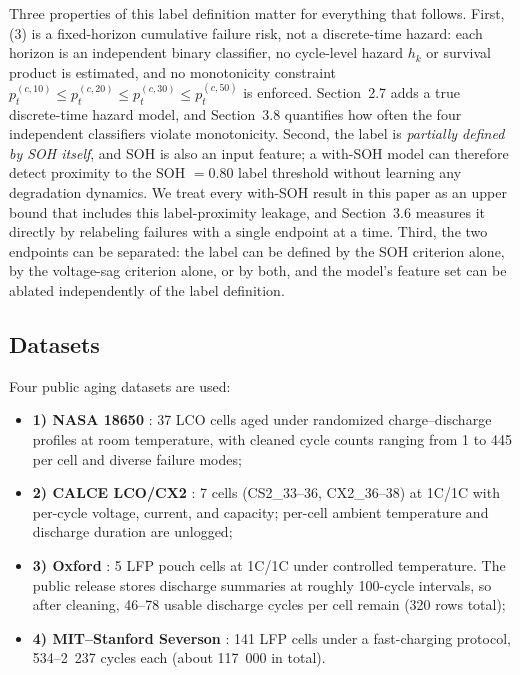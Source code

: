 \documentclass[IJPHM, 2014, 00]{PHMSociety}
\begin{document}
Three properties of this label definition matter for everything that follows. First, (3) is a fixed-horizon cumulative failure risk, not a discrete-time hazard: each horizon is an independent binary classifier, no cycle-level hazard $h_k$ or survival product is estimated, and no monotonicity constraint $p_t^{(c,10)}\le p_t^{(c,20)}\le p_t^{(c,30)}\le p_t^{(c,50)}$ is enforced. Section~2.7 adds a true discrete-time hazard model, and Section~3.8 quantifies how often the four independent classifiers violate monotonicity. Second, the label is \emph{partially defined by SOH itself}, and SOH is also an input feature; a with-SOH model can therefore detect proximity to the SOH $=0.80$ label threshold without learning any degradation dynamics. We treat every with-SOH result in this paper as an upper bound that includes this label-proximity leakage, and Section~3.6 measures it directly by relabeling failures with a single endpoint at a time. Third, the two endpoints can be separated: the label can be defined by the SOH criterion alone, by the voltage-sag criterion alone, or by both, and the model's feature set can be ablated independently of the label definition.

\subsection{Datasets}
Four public aging datasets are used:
\begin{itemize}
\item \textbf{1) NASA 18650} \cite{saha2007battery}: 37 LCO cells aged under randomized charge--discharge profiles at room temperature, with cleaned cycle counts ranging from 1 to 445 per cell and diverse failure modes;
\item \textbf{2) CALCE LCO/CX2} \cite{calce2023battery}: 7 cells (CS2\_33--36, CX2\_36--38) at 1C/1C with per-cycle voltage, current, and capacity; per-cell ambient temperature and discharge duration are unlogged;
\item \textbf{3) Oxford} \cite{birkl2017oxford}: 5 LFP pouch cells at 1C/1C under controlled temperature. The public release stores discharge summaries at roughly 100-cycle intervals, so after cleaning, 46--78 usable discharge cycles per cell remain (320 rows total);
\item \textbf{4) MIT--Stanford Severson} \cite{severson2019data}: 141 LFP cells under a fast-charging protocol, 534--2~237 cycles each (about 117~000 in total).
\end{itemize}
\end{document}

